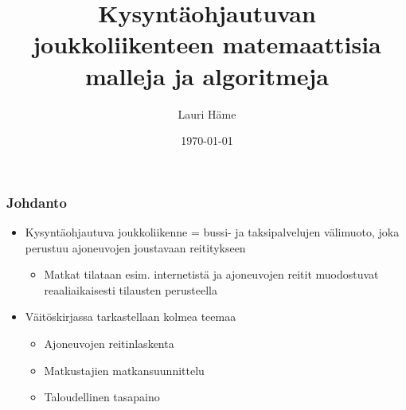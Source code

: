 \documentclass{beamer}
\title[Aalto-yliopiston perustieteiden korkeakoulu]{Kysyntäohjautuvan joukkoliikenteen matemaattisia malleja ja algoritmeja}
\author[L. Häme]{Lauri Häme}                 %
\institute[Aalto-yliopiston perustieteiden korkeakoulu]{Aalto-yliopiston perustieteiden korkeakoulu}      %
\date{\today}      %
\begin{document}
\begin{frame}
  \titlepage
\end{frame}


\begin{frame}
  \frametitle{Johdanto}   %
  \begin{itemize}
    \item 
Kysyntäohjautuva joukkoliikenne = bussi- ja taksipalvelujen välimuoto, joka perustuu ajoneuvojen joustavaan reititykseen
\begin{itemize}
 \item 
 Matkat tilataan esim. internetistä ja ajoneuvojen reitit muodostuvat reaaliaikaisesti tilausten perusteella
 \end{itemize}
 
  \item 
Väitöskirjassa tarkastellaan kolmea teemaa
 \begin{itemize}
\item
Ajoneuvojen reitinlaskenta
\item
Matkustajien matkansuunnittelu
\item
Taloudellinen tasapaino
\end{itemize}
 \end{itemize}

 
\end{frame}
\end{document}
